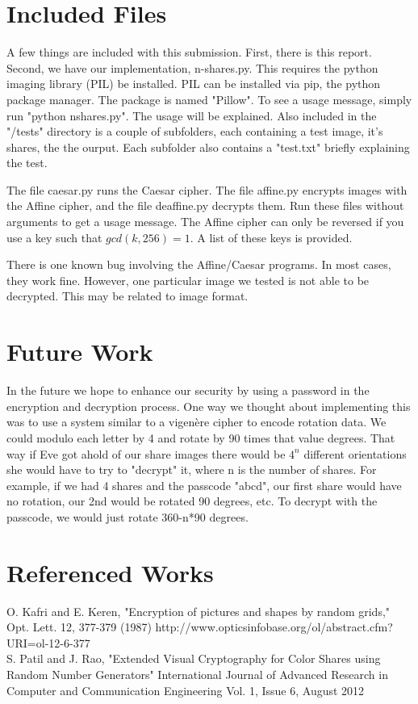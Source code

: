 \documentclass{article}
\begin{document}
\section*{Included Files}
A few things are included with this submission.  First, there is this report.  Second, we have our implementation, n-shares.py. This requires the python imaging library (PIL) be installed.  PIL can be installed via pip, the python package manager.  The package is named "Pillow".  To see a usage message, simply run "python nshares.py".  The usage will be explained.  Also included in the "/tests" directory is a couple of subfolders, each containing a test image, it's shares, the the ourput.  Each subfolder also contains a "test.txt" briefly explaining the test.  

The file caesar.py runs the Caesar cipher.  The file affine.py encrypts images with the Affine cipher, and the file deaffine.py decrypts them.  Run these files without arguments to get a usage message.   The Affine cipher can only be reversed if you use a key such that $gcd(k, 256) = 1$.  A list of these keys is provided.

There is one known bug involving the Affine/Caesar programs.  In most cases, they work fine.  However, one particular image we tested is not able to be decrypted.  This may be related to image format.
\section*{Future Work}
In the future we hope to enhance our security by using a password in the encryption and decryption process.  One way we thought about implementing this was to use a system similar to a vigenère cipher to encode rotation data.  We could modulo each letter by 4 and rotate by 90 times that value degrees.  That way if Eve got ahold of our share images there would be $4^n$ different orientations she would have to try to "decrypt" it, where n is the number of shares.  For example, if we had 4 shares and the passcode "abcd", our first share would have no rotation, our 2nd would be rotated 90 degrees, etc.  To decrypt with the passcode, we would just rotate 360-n*90 degrees.  
\section*{Referenced Works}
O. Kafri and E. Keren, "Encryption of pictures and shapes by random grids," Opt. Lett. 12, 377-379 (1987) 
http://www.opticsinfobase.org/ol/abstract.cfm?URI=ol-12-6-377
\\

S. Patil and J. Rao, "Extended Visual Cryptography for Color Shares using Random Number Generators" International Journal of Advanced Research in Computer and Communication Engineering 
 Vol. 1, Issue 6, August 2012 
\end{document}
